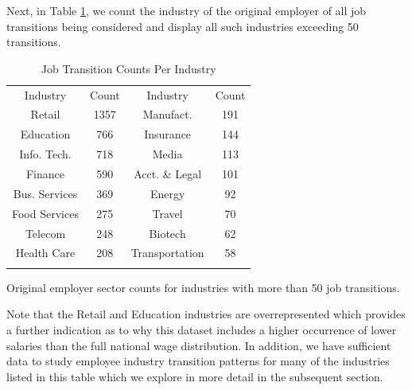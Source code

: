 \documentclass[10pt]{article}
\begin{document}
Next, in Table \ref{tab:indtab}, we count the industry of the original employer 
of all job transitions being considered and display all such industries exceeding 
50 transitions.
%
\begin{table}
  \centering
  \caption{Job Transition Counts Per Industry}
  \begin{tabular}{cccc}
    \rowcolor{gray!50}
      Industry & Count & Industry & Count \\
      Retail & 1357 & Manufact. & 191\\
      Education & 766 & Insurance & 144\\
      Info. Tech. & 718 & Media & 113\\
      Finance & 590 & Acct. \& Legal & 101\\
      Bus. Services & 369 & Energy & 92\\
      Food Services & 275  & Travel & 70\\
      Telecom & 248 & Biotech & 62\\
      Health Care & 208 & Transportation & 58\\
	\label{tab:indtab}
  \end{tabular}
Original employer sector counts for industries with more than 50 job transitions.
\end{table}
%
Note that the Retail and Education industries are overrepresented which 
provides a further indication as to why this dataset includes a higher occurrence 
of lower salaries  than the full national wage distribution. In addition, we have sufficient data to study employee industry 
transition patterns for many of the industries listed in this table which 
we explore in more detail in the subsequent section.
\end{document}

